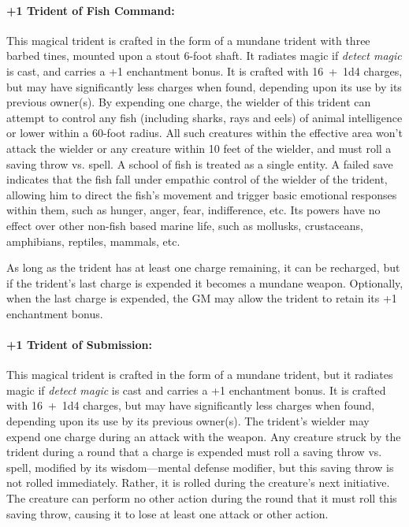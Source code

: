 \begin{multicols}{2}
\paragraph{+1 Trident of Fish Command:} This magical trident is crafted in the form of a mundane trident with three barbed tines, mounted upon a stout 6-foot shaft.  It radiates magic if \textit{detect magic} is cast, and carries a +1 enchantment bonus.  It is crafted with 16~+~1d4 charges, but may have significantly less charges when found, depending upon its use by its previous owner(s).  By expending one charge, the wielder of this trident can attempt to control any fish (including sharks, rays and eels) of animal intelligence or lower within a 60-foot radius.  All such creatures within the effective area won't attack the wielder or any creature within 10 feet of the wielder, and must roll a saving throw vs. spell.  A school of fish is treated as a single entity.  A failed save indicates that the fish fall under empathic control of the wielder of the trident, allowing him to direct the fish's movement and trigger basic emotional responses within them, such as hunger, anger, fear, indifference, etc.  Its powers have no effect over other non-fish based marine life, such as mollusks, crustaceans, amphibians, reptiles, mammals, etc. 

As long as the trident has at least one charge remaining, it can be recharged, but if the trident's last charge is expended it becomes a mundane weapon.  Optionally, when the last charge is expended, the GM may allow the trident to retain its +1 enchantment bonus.

\paragraph{+1 Trident of Submission:} This magical trident is crafted in the form of a mundane trident, but it radiates magic if \textit{detect magic} is cast and carries a +1 enchantment bonus.  It is crafted with 16~+~1d4 charges, but may have significantly less charges when found, depending upon its use by its previous owner(s).  The trident's wielder may expend one charge during an attack with the weapon.  Any creature struck by the trident during a round that a charge is expended must roll a saving throw vs. spell, modified by its wisdom---mental defense modifier, but this saving throw is not rolled immediately.  Rather, it is rolled during the creature's next initiative.  The creature can perform no other action during the round that it must roll this saving throw, causing it to lose at least one attack or other action.  


\end{multicols}
